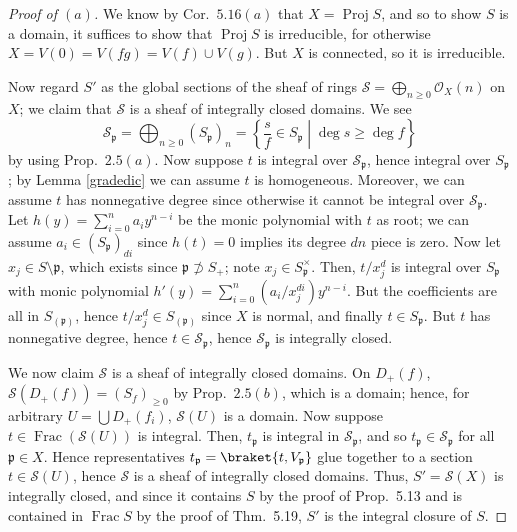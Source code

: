 \documentclass[10pt]{article}
\theoremstyle{definition}
\theoremstyle{remark}
\numberwithin{equation}{section}
\numberwithin{figure}{subsubsection}
\DeclareMathOperator{\Frac}{Frac}
\DeclareMathOperator{\Proj}{Proj}
\newcommand{\OO}{\mathcal{O}}
\begin{document}
\begin{proof}[Proof of $(a)$]
  We know by Cor.~$5.16(a)$ that $X = \Proj S$, and so to show $S$ is a domain, it suffices to show that $\Proj S$ is irreducible, for otherwise $X = V(0) = V(fg) = V(f) \cup V(g)$. But $X$ is connected, so it is irreducible.
  \par Now regard $S'$ as the global sections of the sheaf of rings $\mathscr{S} = \bigoplus_{n \ge 0} \OO_X(n)$ on $X$; we claim that $\mathscr{S}$ is a sheaf of integrally closed domains. We see
  \begin{equation*}
    \mathscr{S}_{\mathfrak{p}} = \bigoplus_{n \ge 0} (S_{\mathfrak{p}})_n = \left\{ \frac{s}{f} \in S_{\mathfrak{p}} \middle\vert \deg s \ge \deg f \right\}
  \end{equation*}
  by using Prop.~$2.5(a)$. Now suppose $t$ is integral over $\mathscr{S}_{\mathfrak{p}}$, hence integral over $S_{\mathfrak{p}}$; by Lemma \ref{gradedic} we can assume $t$ is homogeneous. Moreover, we can assume $t$ has nonnegative degree since otherwise it cannot be integral over $\mathscr{S}_{\mathfrak{p}}$. Let $h(y) = \sum_{i=0}^n a_iy^{n-i}$ be the monic polynomial with $t$ as root; we can assume $a_i \in (S_\mathfrak{p})_{di}$ since $h(t) = 0$ implies its degree $dn$ piece is zero. Now let $x_j \in S \setminus \mathfrak{p}$, which exists since $\mathfrak{p} \not\supset S_+$; note $x_j \in S_{\mathfrak{p}}^\times$. Then, $t/x_j^d$ is integral over $S_{\mathfrak{p}}$ with monic polynomial $h'(y) = \sum_{i=0}^n (a_i/x_j^{di}) y^{n-i}$. But the coefficients are all in $S_{(\mathfrak{p})}$, hence $t/x_j^d \in S_{(\mathfrak{p})}$ since $X$ is normal, and finally $t \in S_{\mathfrak{p}}$. But $t$ has nonnegative degree, hence $t \in \mathscr{S}_{\mathfrak{p}}$, hence $\mathscr{S}_{\mathfrak{p}}$ is integrally closed.
  \par We now claim $\mathscr{S}$ is a sheaf of integrally closed domains. On $D_+(f)$, $\mathscr{S}(D_+(f)) = (S_f)_{\ge0}$ by Prop.~$2.5(b)$, which is a domain; hence, for arbitrary $U = \bigcup D_+(f_i)$, $\mathscr{S}(U)$ is a domain. Now suppose $t \in \Frac(\mathscr{S}(U))$ is integral. Then, $t_\mathfrak{p}$ is integral in $\mathscr{S}_\mathfrak{p}$, and so $t_\mathfrak{p} \in \mathscr{S}_{\mathfrak{p}}$ for all $\mathfrak{p} \in X$. Hence representatives $t_\mathfrak{p} = \braket{t,V_\mathfrak{p}}$ glue together to a section $t \in \mathscr{S}(U)$, hence $\mathscr{S}$ is a sheaf of integrally closed domains. Thus, $S' = \mathscr{S}(X)$ is integrally closed, and since it contains $S$ by the proof of Prop.~5.13 and is contained in $\Frac S$ by the proof of Thm.~5.19, $S'$ is the integral closure of $S$.
\end{proof}
\end{document}
